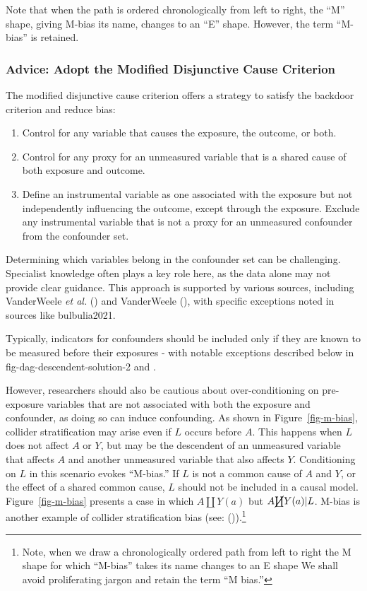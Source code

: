 \documentclass[
  singlecolumn,
  9pt]{article}
\providecommand{\tightlist}{%
  \setlength{\itemsep}{0pt}\setlength{\parskip}{0pt}}\usepackage{longtable,booktabs,array}
\begin{document}
Note that when the path is ordered chronologically from left to right,
the ``M'' shape, giving M-bias its name, changes to an ``E'' shape.
However, the term ``M-bias'' is retained.

\subsubsection{Advice: Adopt the Modified Disjunctive Cause
Criterion}\label{advice-adopt-the-modified-disjunctive-cause-criterion}

The modified disjunctive cause criterion offers a strategy to satisfy
the backdoor criterion and reduce bias:

\begin{enumerate}
\def\labelenumi{\alph{enumi}.}
\tightlist
\item
  Control for any variable that causes the exposure, the outcome, or
  both.
\item
  Control for any proxy for an unmeasured variable that is a shared
  cause of both exposure and outcome.
\item
  Define an instrumental variable as one associated with the exposure
  but not independently influencing the outcome, except through the
  exposure. Exclude any instrumental variable that is not a proxy for an
  unmeasured confounder from the confounder set.
\end{enumerate}

Determining which variables belong in the confounder set can be
challenging. Specialist knowledge often plays a key role here, as the
data alone may not provide clear guidance. This approach is supported by
various sources, including VanderWeele \emph{et al.}
() and VanderWeele
(), with specific exceptions noted
in sources like bulbulia2021.

Typically, indicators for confounders should be included only if they
are known to be measured before their exposures - with notable
exceptions described below in fig-dag-descendent-solution-2 and .

However, researchers should also be cautious about over-conditioning on
pre-exposure variables that are not associated with both the exposure
and confounder, as doing so can induce confounding. As shown in
Figure~\ref{fig-m-bias}, collider stratification may arise even if \(L\)
occurs before \(A\). This happens when \(L\) does not affect \(A\) or
\(Y\), but may be the descendent of an unmeasured variable that affects
\(A\) and another unmeasured variable that also affects \(Y\).
Conditioning on \(L\) in this scenario evokes ``M-bias.'' If \(L\) is
not a common cause of \(A\) and \(Y\), or the effect of a shared common
cause, \(L\) should not be included in a causal model.
Figure~\ref{fig-m-bias} presents a case in which \(A \coprod Y(a)\) but
\(A \cancel{\coprod} Y(a)| L\). M-bias is another example of collider
stratification bias (see: ()).\footnote{Note, when we draw a chronologically ordered path from
  left to right the M shape for which ``M-bias'' takes its name changes
  to an E shape We shall avoid proliferating jargon and retain the term
  ``M bias.''}
\end{document}
